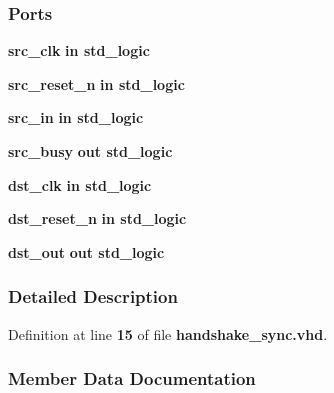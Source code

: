 \subsubsection*{Ports}
 \begin{DoxyCompactItemize}
\item 
{\bf src\+\_\+clk}  {\bfseries {\bfseries \textcolor{keywordflow}{in}\textcolor{vhdlchar}{ }}} {\bfseries \textcolor{comment}{std\+\_\+logic}\textcolor{vhdlchar}{ }} 
\item 
{\bf src\+\_\+reset\+\_\+n}  {\bfseries {\bfseries \textcolor{keywordflow}{in}\textcolor{vhdlchar}{ }}} {\bfseries \textcolor{comment}{std\+\_\+logic}\textcolor{vhdlchar}{ }} 
\item 
{\bf src\+\_\+in}  {\bfseries {\bfseries \textcolor{keywordflow}{in}\textcolor{vhdlchar}{ }}} {\bfseries \textcolor{comment}{std\+\_\+logic}\textcolor{vhdlchar}{ }} 
\item 
{\bf src\+\_\+busy}  {\bfseries {\bfseries \textcolor{keywordflow}{out}\textcolor{vhdlchar}{ }}} {\bfseries \textcolor{comment}{std\+\_\+logic}\textcolor{vhdlchar}{ }} 
\item 
{\bf dst\+\_\+clk}  {\bfseries {\bfseries \textcolor{keywordflow}{in}\textcolor{vhdlchar}{ }}} {\bfseries \textcolor{comment}{std\+\_\+logic}\textcolor{vhdlchar}{ }} 
\item 
{\bf dst\+\_\+reset\+\_\+n}  {\bfseries {\bfseries \textcolor{keywordflow}{in}\textcolor{vhdlchar}{ }}} {\bfseries \textcolor{comment}{std\+\_\+logic}\textcolor{vhdlchar}{ }} 
\item 
{\bf dst\+\_\+out}  {\bfseries {\bfseries \textcolor{keywordflow}{out}\textcolor{vhdlchar}{ }}} {\bfseries \textcolor{comment}{std\+\_\+logic}\textcolor{vhdlchar}{ }} 
\end{DoxyCompactItemize}


\subsubsection{Detailed Description}


Definition at line {\bf 15} of file {\bf handshake\+\_\+sync.\+vhd}.



\subsubsection{Member Data Documentation}
